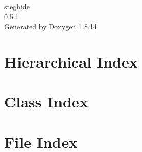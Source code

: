 \documentclass[twoside]{book}
\newcommand{\+}{\discretionary{\mbox{\scriptsize$\hookleftarrow$}}{}{}}
\newcommand{\clearemptydoublepage}{%
  \newpage{\pagestyle{empty}\cleardoublepage}%
}
\begin{document}
\begin{titlepage}
\vspace*{7cm}
\begin{center}%
{\Large steghide \\[1ex]\large 0.\+5.\+1 }\\
\vspace*{1cm}
{\large Generated by Doxygen 1.8.14}\\
\end{center}
\end{titlepage}
\clearemptydoublepage
{}
\tableofcontents
\clearemptydoublepage
{}

\chapter{Hierarchical Index}

\chapter{Class Index}

\chapter{File Index}

\end{document}
